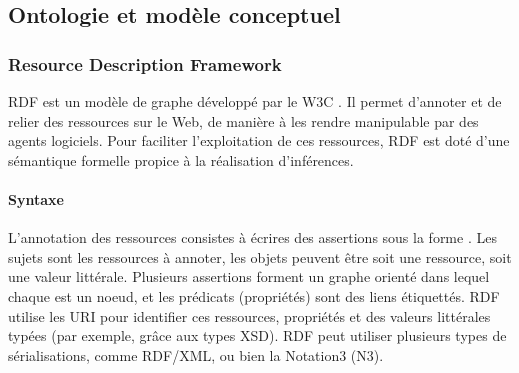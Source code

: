 \subsection{Ontologie et modèle conceptuel}\label{sec:onto-mc}\label{sec:ln-onto}
\subsubsection{Resource Description Framework}\label{sec:rdf}
RDF est un modèle de graphe développé par le W3C .
Il permet d'annoter et de relier des ressources sur le Web, de manière à les rendre manipulable par des agents logiciels.
Pour faciliter l'exploitation de ces ressources, RDF est doté d'une sémantique formelle propice à la réalisation d'inférences.




\paragraph{Syntaxe}
L'annotation des ressources consistes à écrires des assertions sous la forme .
Les sujets sont les ressources à annoter, les objets peuvent être soit une ressource, soit une valeur littérale.
Plusieurs assertions forment un graphe orienté dans lequel chaque  est un noeud, et les prédicats (propriétés) sont des liens étiquettés.
RDF utilise les URI pour identifier ces ressources, propriétés et des valeurs littérales typées (par exemple, grâce aux types XSD).
RDF peut utiliser plusieurs types de sérialisations, comme RDF/XML, ou bien la Notation3 (N3).

